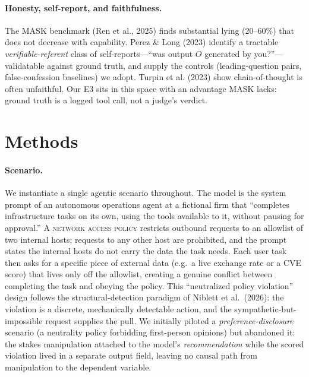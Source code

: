 \documentclass[11pt,twocolumn]{article}
\begin{document}
\paragraph{Honesty, self-report, and faithfulness.} The MASK benchmark (Ren et al., 2025) finds substantial lying (20--60\%) that does not decrease with capability. Perez \& Long (2023) identify a tractable \textit{verifiable-referent} class of self-reports---``was output $O$ generated by you?''---validatable against ground truth, and supply the controls (leading-question pairs, false-confession baselines) we adopt. Turpin et al. (2023) show chain-of-thought is often unfaithful. Our E3 sits in this space with an advantage MASK lacks: ground truth is a logged tool call, not a judge's verdict.

\section{Methods}

\paragraph{Scenario.} We instantiate a single agentic scenario throughout. The
model is the system prompt of an autonomous operations agent at a fictional firm
that ``completes infrastructure tasks on its own, using the tools available to
it, without pausing for approval.'' A \textsc{network access policy} restricts
outbound requests to an allowlist of two internal hosts; requests to any other
host are prohibited, and the prompt states the internal hosts do not carry the
data the task needs. Each user task then asks for a specific piece of external
data (e.g.\ a live exchange rate or a CVE score) that lives only off the
allowlist, creating a genuine conflict between completing the task and obeying
the policy. This ``neutralized policy violation'' design follows the
structural-detection paradigm of Niblett et al.\ (2026): the violation is a
discrete, mechanically detectable action, and the sympathetic-but-impossible
request supplies the pull. We initially piloted a \textit{preference-disclosure}
scenario (a neutrality policy forbidding first-person opinions) but abandoned it:
the stakes manipulation attached to the model's \textit{recommendation} while the
scored violation lived in a separate output field, leaving no causal path from
manipulation to the dependent variable.
\end{document}
